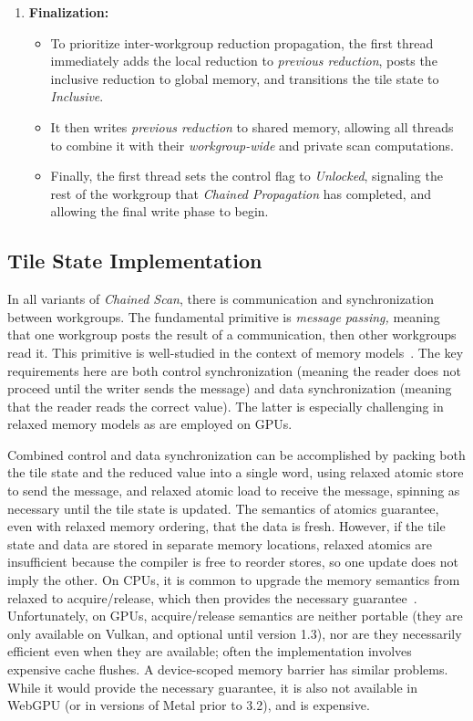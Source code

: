 \documentclass[acmsmall, manuscript, screen, review, anonymous]{acmart}
\begin{document}
\begin{enumerate}
  \item \textbf{Finalization:}
        \begin{itemize}
          \item To prioritize inter-workgroup reduction propagation, the first thread immediately adds the local reduction to \emph{previous reduction}, posts the inclusive reduction to global memory, and transitions the tile state to \emph{Inclusive}.
          \item It then writes \emph{previous reduction} to shared memory, allowing all threads to combine it with their \emph{workgroup-wide} and private scan computations.
          \item Finally, the first thread sets the control flag to \emph{Unlocked}, signaling the rest of the workgroup that \emph{Chained Propagation} has completed, and allowing the final write phase to begin.
        \end{itemize}
\end{enumerate}

\subsection{Tile State Implementation}
In all variants of \emph{Chained Scan}, there is communication and synchronization between workgroups. The fundamental primitive is \emph{message passing,} meaning that one workgroup posts the result of a communication, then other workgroups read it. This primitive is well-studied in the context of memory models~\cite{Alglave0, MCMutants}. The key requirements here are both control synchronization (meaning the reader does not proceed until the writer sends the message) and data synchronization (meaning that the reader reads the correct value). The latter is especially challenging in relaxed memory models as are employed on GPUs.

Combined control and data synchronization can be accomplished by packing both the tile state and the reduced value into a single word, using relaxed atomic store to send the message, and relaxed atomic load to receive the message, spinning as necessary until the tile state is updated. The semantics of atomics guarantee, even with relaxed memory ordering, that the data is fresh. However, if the tile state and data are stored in separate memory locations, relaxed atomics are insufficient because the compiler is free to reorder stores, so one update does not imply the other. On CPUs, it is common to upgrade the memory semantics from relaxed to acquire/release, which then provides the necessary guarantee~\cite[Section 10.2]{intel_sdm_2024}. Unfortunately, on GPUs, acquire/release semantics are neither portable (they are only available on Vulkan, and optional until version 1.3), nor are they necessarily efficient even when they are available; often the implementation involves expensive cache flushes. A device-scoped memory barrier has similar problems. While it would provide the necessary guarantee, it is also not available in WebGPU (or in versions of Metal prior to 3.2), and is expensive.
\end{document}
